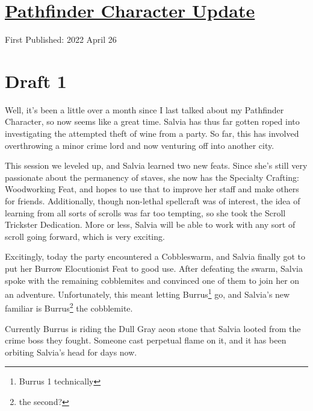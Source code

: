 \documentclass[12pt]{article}[titlepage]
\renewcommand{\,}{\textsuperscript{,}}
\begin{document}
\doublespacing
\section{\href{pathfinder-1.html}{Pathfinder Character Update}}
First Published: 2022 April 26

\section{Draft 1}
Well, it's been a little over a month since I last talked about my Pathfinder Character, so now seems like a great time.
Salvia has thus far gotten roped into investigating the attempted theft of wine from a party.
So far, this has involved overthrowing a minor crime lord and now venturing off into another city.

This session we leveled up, and Salvia learned two new feats.
Since she's still very passionate about the permanency of staves, she now has the Specialty Crafting: Woodworking Feat, and hopes to use that to improve her staff and make others for friends.
Additionally, though non-lethal spellcraft was of interest, the idea of learning from all sorts of scrolls was far too tempting, so she took the Scroll Trickster Dedication.
More or less, Salvia will be able to work with any sort of scroll going forward, which is very exciting.

Excitingly, today the party encountered a Cobbleswarm, and Salvia finally got to put her Burrow Elocutionist Feat to good use.
After defeating the swarm, Salvia spoke with the remaining cobblemites and convinced one of them to join her on an adventure.
Unfortunately, this meant letting Burrus\footnote{Burrus 1 technically} go, and Salvia's new familiar is Burrus\footnote{the second?} the cobblemite.

Currently Burrus is riding the Dull Gray aeon stone that Salvia looted from the crime boss they fought.
Someone cast perpetual flame on it, and it has been orbiting Salvia's head for days now.
\end{document}
